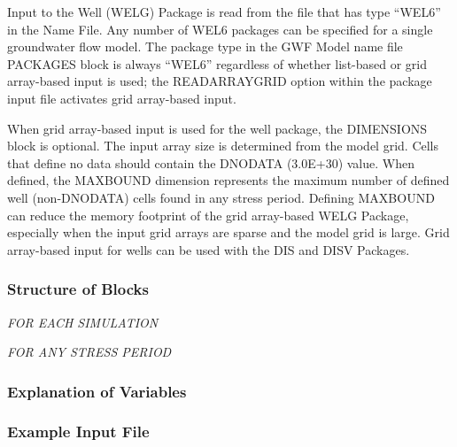 Input to the Well (WELG) Package is read from the file that has type ``WEL6'' in the Name File.  Any number of WEL6 packages can be specified for a single groundwater flow model.  The package type in the GWF Model name file PACKAGES block is always ``WEL6'' regardless of whether list-based or grid array-based input is used; the READARRAYGRID option within the package input file activates grid array-based input.

When grid array-based input is used for the well package, the DIMENSIONS block is optional.  The input array size is determined from the model grid.  Cells that define no data should contain the DNODATA (3.0E+30) value.  When defined, the MAXBOUND dimension represents the maximum number of defined well (non-DNODATA) cells found in any stress period.  Defining MAXBOUND can reduce the memory footprint of the grid array-based WELG Package, especially when the input grid arrays are sparse and the model grid is large.  Grid array-based input for wells can be used with the DIS and DISV Packages.

\vspace{5mm}
\subsubsection{Structure of Blocks}
\vspace{5mm}

\noindent \textit{FOR EACH SIMULATION}


\vspace{5mm}
\noindent \textit{FOR ANY STRESS PERIOD}


\vspace{5mm}
\subsubsection{Explanation of Variables}
\begin{description}

\end{description}

\vspace{5mm}
\subsubsection{Example Input File}


